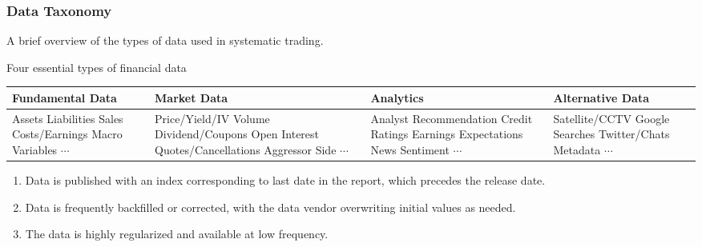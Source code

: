 \subsubsection{Data Taxonomy}

A brief overview of the types of data used in systematic trading.

\begin{flushleft}
Four essential types of financial data
\begin{tabularx}{\textwidth}{X|X|p{13em}|X}
\hline
\rowcolor{gray!30}
Fundamental Data & Market Data & Analytics & Alternative Data \\
\hline
Assets \newline
Liabilities \newline
Sales \newline
Costs/Earnings \newline
Macro Variables \newline
$\cdots$
&
Price/Yield/IV \newline
Volume \newline
Dividend/Coupons \newline
Open Interest \newline
Quotes/Cancellations \newline
Aggressor Side \newline
$\cdots$
&
Analyst Recommendation \newline
Credit Ratings \newline
Earnings Expectations \newline
News Sentiment \newline
$\cdots$
&
Satellite/CCTV \newline
Google Searches \newline
Twitter/Chats \newline
Metadata \newline
$\cdots$ \\
\hline
\end{tabularx}
\end{flushleft}

\begin{remark} 
\begin{enumerate}[label=\roman*.]
\setlength{\itemsep}{0pt}
\item Data is published with an index corresponding to last date in the report, which precedes the release date.
\item Data is frequently backfilled or corrected, with the data vendor overwriting initial values as needed.
\item The data is highly regularized and available at low frequency.
\end{enumerate}
\end{remark}


